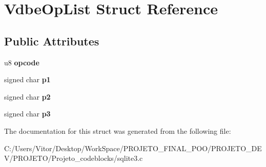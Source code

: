 \hypertarget{struct_vdbe_op_list}{\section{Vdbe\-Op\-List Struct Reference}
\label{struct_vdbe_op_list}
}
\subsection*{Public Attributes}
\begin{DoxyCompactItemize}
\item 
\hypertarget{struct_vdbe_op_list_a9c839a619aed99f91cb5e226487be7be}{u8 {\bfseries opcode}}\label{struct_vdbe_op_list_a9c839a619aed99f91cb5e226487be7be}

\item 
\hypertarget{struct_vdbe_op_list_a68641ef4313dfdfafe45b75203c49d5a}{signed char {\bfseries p1}}\label{struct_vdbe_op_list_a68641ef4313dfdfafe45b75203c49d5a}

\item 
\hypertarget{struct_vdbe_op_list_a8493431402f7f91cea81c00e311dc4e1}{signed char {\bfseries p2}}\label{struct_vdbe_op_list_a8493431402f7f91cea81c00e311dc4e1}

\item 
\hypertarget{struct_vdbe_op_list_a584cdaa02042fd5d1bc8cffbdfd9441d}{signed char {\bfseries p3}}\label{struct_vdbe_op_list_a584cdaa02042fd5d1bc8cffbdfd9441d}

\end{DoxyCompactItemize}


The documentation for this struct was generated from the following file\-:\begin{DoxyCompactItemize}
\item 
C\-:/\-Users/\-Vitor/\-Desktop/\-Work\-Space/\-P\-R\-O\-J\-E\-T\-O\-\_\-\-F\-I\-N\-A\-L\-\_\-\-P\-O\-O/\-P\-R\-O\-J\-E\-T\-O\-\_\-\-D\-E\-V/\-P\-R\-O\-J\-E\-T\-O/\-Projeto\-\_\-codeblocks/sqlite3.\-c\end{DoxyCompactItemize}

